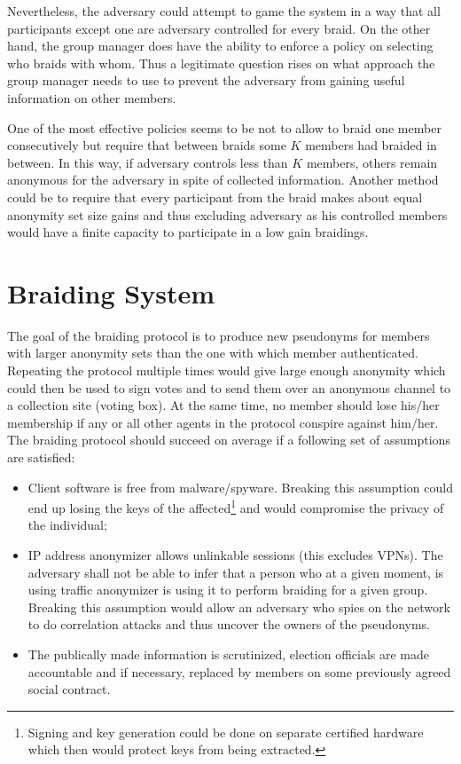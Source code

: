 \documentclass[12pt]{article}
\begin{document}
Nevertheless, the adversary could attempt to game the system in a way that all participants except one are adversary controlled for every braid. On the other hand, the group manager does have the ability to enforce a policy on selecting who braids with whom. Thus a legitimate question rises on what approach the group manager needs to use to prevent the adversary from gaining useful information on other members.

One of the most effective policies seems to be not to allow to braid one member consecutively but require that between braids some $K$ members had braided in between. In this way, if adversary controls less than $K$ members, others remain anonymous for the adversary in spite of collected information. Another method could be to require that every participant from the braid makes about equal anonymity set size gains and thus excluding adversary as his controlled members would have a finite capacity to participate in a low gain braidings. 


\section*{Braiding System}

The goal of the braiding protocol is to produce new pseudonyms for members with larger anonymity sets than the one with which member authenticated. Repeating the protocol multiple times would give large enough anonymity which could then be used to sign votes and to send them over an anonymous channel to a collection site (voting box). At the same time, no member should lose his/her membership if any or all other agents in the protocol conspire against him/her. The braiding protocol should succeed on average if a following set of assumptions are satisfied:
\begin{itemize}
\item Client software is free from malware/spyware. Breaking this assumption could end up losing the keys of the affected\footnote{Signing and key generation could be done on separate certified hardware which then would protect keys from being extracted.} and would compromise the privacy of the individual;
\item IP address anonymizer allows unlinkable sessions (this excludes VPNs). The adversary shall not be able to infer that a person who at a given moment, is using traffic anonymizer is using it to perform braiding for a given group. Breaking this assumption would allow an adversary who spies on the network to do correlation attacks and thus uncover the owners of the pseudonyms. 
\item The publically made information is scrutinized, election officials are made accountable and if necessary, replaced by members on some previously agreed social contract. 
\end{itemize}
\end{document}

